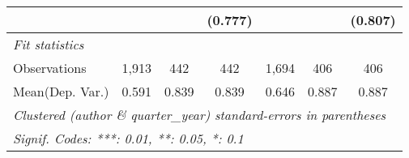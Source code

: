 \begin{tabular}{lcccccc}
                           &                &         & (0.777)     &                &         & (0.807)\\   
   \midrule
   \emph{Fit statistics}\\
   Observations            & 1,913          & 442     & 442         & 1,694          & 406     & 406\\  
Mean(Dep. Var.) & 0.591 & 0.839 & 0.839 & 0.646 & 0.887 & 0.887 \\
   \midrule \midrule
   \multicolumn{7}{l}{\emph{Clustered (author \& quarter\_year) standard-errors in parentheses}}\\
   \multicolumn{7}{l}{\emph{Signif. Codes: ***: 0.01, **: 0.05, *: 0.1}}\\
\end{tabular}
\par\endgroup

